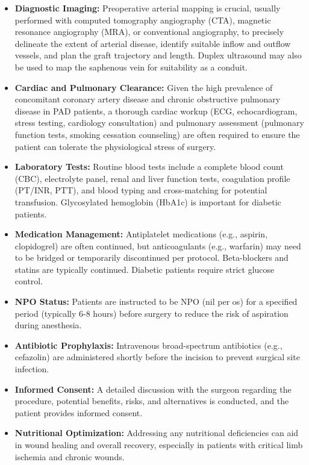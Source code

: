 \begin{itemize}
  \item \textbf{Diagnostic Imaging:} Preoperative arterial mapping is crucial, usually performed with computed tomography angiography (CTA), magnetic resonance angiography (MRA), or conventional angiography, to precisely delineate the extent of arterial disease, identify suitable inflow and outflow vessels, and plan the graft trajectory and length. Duplex ultrasound may also be used to map the saphenous vein for suitability as a conduit.
  
  \item \textbf{Cardiac and Pulmonary Clearance:} Given the high prevalence of concomitant coronary artery disease and chronic obstructive pulmonary disease in PAD patients, a thorough cardiac workup (ECG, echocardiogram, stress testing, cardiology consultation) and pulmonary assessment (pulmonary function tests, smoking cessation counseling) are often required to ensure the patient can tolerate the physiological stress of surgery.
  
  \item \textbf{Laboratory Tests:} Routine blood tests include a complete blood count (CBC), electrolyte panel, renal and liver function tests, coagulation profile (PT/INR, PTT), and blood typing and cross-matching for potential transfusion. Glycosylated hemoglobin (HbA1c) is important for diabetic patients.
  
  \item \textbf{Medication Management:} Antiplatelet medications (e.g., aspirin, clopidogrel) are often continued, but anticoagulants (e.g., warfarin) may need to be bridged or temporarily discontinued per protocol. Beta-blockers and statins are typically continued. Diabetic patients require strict glucose control.
  
  \item \textbf{NPO Status:} Patients are instructed to be NPO (nil per os) for a specified period (typically 6-8 hours) before surgery to reduce the risk of aspiration during anesthesia.
  
  \item \textbf{Antibiotic Prophylaxis:} Intravenous broad-spectrum antibiotics (e.g., cefazolin) are administered shortly before the incision to prevent surgical site infection.
  
  \item \textbf{Informed Consent:} A detailed discussion with the surgeon regarding the procedure, potential benefits, risks, and alternatives is conducted, and the patient provides informed consent.
  
  \item \textbf{Nutritional Optimization:} Addressing any nutritional deficiencies can aid in wound healing and overall recovery, especially in patients with critical limb ischemia and chronic wounds.
\end{itemize}

